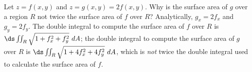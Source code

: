 {Let $z=f(x,y)$ and $z=g(x,y)=2f(x,y)$. Why is the surface area of $g$ over a region $R$ not twice the surface area of $f$ over $R$?
}
{Analytically, $g_x = 2f_x$ and $g_y=2f_y$. The double integral to compute the surface area of $f$ over $R$ is $\ds \iint_R \sqrt{1+f_x^2+f_y^2}\ dA$; the double integral to compute the surface area of $g$ over $R$ is $\ds \iint_R\sqrt{1+4f_x^2+4f_y^2}\ dA$, which is \textit{not} twice the double integral used to calculate the surface area of $f$.
}